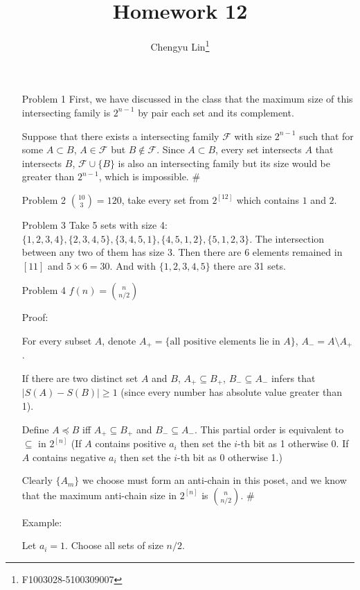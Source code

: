\documentclass{article}
\title{Homework 12}
\author{Chengyu Lin\footnote{F1003028-5100309007}}
\date{}
\begin{document}
\maketitle

\begin{itemize}
    \item[Problem 1]
        First, we have discussed in the class that the maximum
        size of this intersecting family is $2^{n-1}$ by pair
        each set and its complement.

        Suppose that there exists a intersecting family $\mathcal{F}$
        with size $2^{n-1}$ such that for some $A \subset B$, 
        $A \in \mathcal{F}$ but $B \not\in \mathcal{F}$.
        Since $A \subset B$, every set intersects $A$ that intersects
        $B$, $\mathcal{F} \cup \{B\}$ is also an intersecting
        family but its size would be greater than $2^{n-1}$,
        which is impossible. \#

    \item[Problem 2]
        ${10 \choose 3} = 120$, take every set from $2^{[12]}$
        which contains $1$ and $2$.

    \item[Problem 3]
        Take 5 sets with size 4: $\{1,2,3,4\}, \{2,3,4,5\},
        \{3,4,5,1\}, \{4,5,1,2\}, \{5,1,2,3\}$. The intersection
        between any two of them has size 3. Then there are
        6 elements remained in $[11]$ and $5 \times 6=30$.
        And with $\{1,2,3,4,5\}$ there are 31 sets.

    \item[Problem 4]
        $f(n) = {n \choose n/2}$

        Proof:

        For every subset $A$, denote $A_+ = \{\text{all positive
        elements lie in }A\}$, $A_- = A \setminus A_+$.

        If there are two distinct set $A$ and $B$,
        $A_+ \subseteq B_+$, $B_- \subseteq A_-$ infers that
        $|S(A) - S(B)| \ge 1$ (since every number has absolute
        value greater than 1).

        Define $A \preceq B$ iff $A_+ \subseteq B_+$ and 
        $B_- \subseteq A_-$. This partial order is equivalent to
        $\subseteq$ in $2^{[n]}$ (If $A$ contains positive $a_i$
        then set the $i$-th bit as 1 otherwise 0. If $A$ contains
        negative $a_i$ then set the $i$-th bit as 0 otherwise 1.)

        Clearly $\{A_m\}$ we choose must form an anti-chain in this
        poset, and we know that the maximum anti-chain size in $2^{[n]}$
        is ${n \choose n/2}$. \#

        Example:

        Let $a_i = 1$. Choose all sets of size $n/2$.
\end{itemize}
\end{document}
